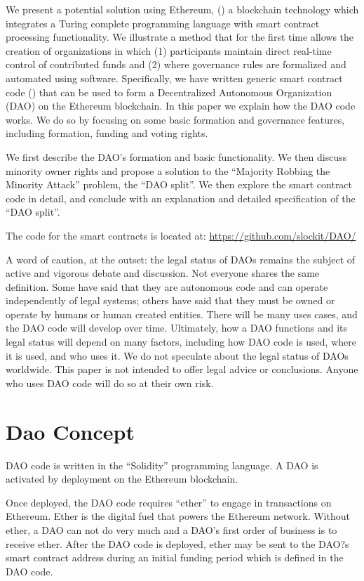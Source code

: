 \documentclass[9pt,oneside]{amsart}
\begin{document}
\begin{multicols}{2}
We present a potential solution using Ethereum, (\cite{buterin2013ethereum,Wood2014ethereum}) a blockchain technology which integrates a Turing complete programming language with smart contract processing functionality. We illustrate a method that for the first time allows the creation of organizations in which (1) participants maintain direct real-time control of contributed funds and (2) where governance rules are formalized and automated using software. Specifically, we have written generic smart contract code (\cite{szabo1997formalizing, miller1997future}) that can be used to form a Decentralized Autonomous Organization (DAO) on the Ethereum blockchain. In this paper we explain how the DAO code works. We do so by focusing on some basic formation and governance features, including formation, funding and voting rights.

We first describe the DAO's formation and basic functionality. We then discuss minority owner rights and propose a solution to the ``Majority Robbing the Minority Attack'' problem, the ``DAO split''. We then explore the smart contract code in detail, and conclude with an explanation and detailed specification of the ``DAO split''.

The code for the smart contracts is located at: \url{https://github.com/slockit/DAO/}

A word of caution, at the outset:  the legal status of DAOs remains the subject of active and vigorous debate and discussion. Not everyone shares the same definition. Some have said that they are autonomous code and can operate independently of legal systems; others have said that they must be owned or operate by humans or human created entities. There will be many uses cases, and the DAO code will develop over time. Ultimately, how a DAO functions and its legal status will depend on many factors, including how DAO code is used, where it is used, and who uses it. We do not speculate about the legal status of DAOs worldwide. This paper is not intended to offer legal advice or conclusions. Anyone who uses DAO code will do so at their own risk.



\section{Dao Concept}

DAO code is written in the ``Solidity'' programming language. A DAO is activated by deployment on the Ethereum blockchain. 

Once deployed, the DAO code requires ``ether'' to engage in transactions on Ethereum. Ether is the digital fuel that powers the Ethereum network. Without ether, a DAO can not do very much and a DAO's first order of business is to receive ether. After the DAO code is deployed, ether may be sent to the DAO?s smart contract address during an initial funding period which is defined in the DAO code. 


\end{multicols}
\end{document}
